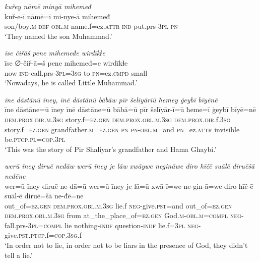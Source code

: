 \ea \label{BP.206}
\textit{kuřey nāmē minyā mihemeđ} \\ 
\gll kuř-e-ī nāmē=ī mi-nye-ā mihemeđ \\ 
 son/boy\textsc{.m}\textsc{-def}\textsc{-obl}\textsc{.m} name.f=ez.\textsc{attr} \textsc{ind-}put.prs\textsc{-3pl} \textsc{pn} \\ 
\glt `They named the son Muhammad.'
\z 
 
\ea \label{BP.207}
\textit{īse čiřāš pene mihemeđe wirdīkɫe} \\ 
\gll īse ∅-čiř-ā=š pene mihemeđ=e wirdīkɫe \\ 
 now \textsc{ind-}call.prs\textsc{-3pl}\textsc{=3sg} to \textsc{pn}=ez\textsc{.cmpd} small \\ 
\glt `Nowadays, he is called Little  Muhammad.'
\z 
 
\ea \label{BP.208}
\textit{īne dāstānū īney, īnē dāstānū bābāw pīr šelīyārīū ħemey ġeybī bīyēnē} \\ 
\gll īne dāstāne=ū īney īnē dāstāne=ū bābā=ū pīr šelīyār-ī=ū ħeme=ī ġeybī bīyē=nē \\ 
 \textsc{dem.prox}\textsc{.dir}\textsc{.m}\textsc{.3sg} story.f\textsc{=ez.gen} \textsc{dem.prox}\textsc{.obl}\textsc{.m}\textsc{.3sg} \textsc{dem.prox}\textsc{.dir}.f\textsc{.3sg} story.f\textsc{=ez.gen} grandfather\textsc{.m}\textsc{=ez.gen} \textsc{pn} \textsc{pn}\textsc{-obl}\textsc{.m}=and \textsc{pn}=ez.\textsc{attr} invisible be\textsc{.ptcp}\textsc{.pl}\textsc{=cop}\textsc{.3pl} \\ 
\glt `This was the story of Pir Shaliyar’s grandfather and Hama Ghaybi.'
\z 
 
\ea \label{BP.211}
\textit{werū īney diruē neđāw werū īney je lāw xwāywe negināwe diro ħīčē suālē diruēšā neđēne} \\ 
\gll wer=ū īney diruē ne-đā=ū wer=ū īney je lā=ū xwā-ī=we ne-gin-ā=we diro ħīč-ē suāl-ē diruē=šā ne-đē=ne \\ 
 out\_of\textsc{=ez.gen} \textsc{dem.prox}\textsc{.obl}\textsc{.m}\textsc{.3sg} lie.f \textsc{neg-}give\textsc{.pst}=and out\_of\textsc{=ez.gen} \textsc{dem.prox}\textsc{.obl}\textsc{.m}\textsc{.3sg} from at\_the\_place\_of\textsc{=ez.gen} God\textsc{.m}\textsc{-obl}\textsc{.m}\textsc{=compl} \textsc{neg-}fall.prs\textsc{-3pl}\textsc{=compl} lie nothing\textsc{-indf} question\textsc{-indf} lie.f\textsc{=3pl} \textsc{neg-}give\textsc{.pst}\textsc{.ptcp}.f\textsc{=cop}\textsc{.3sg}.f \\ 
\glt `In order not to lie, in order not to be liars in the presence of God, they didn’t tell a lie.'
\z 
 

